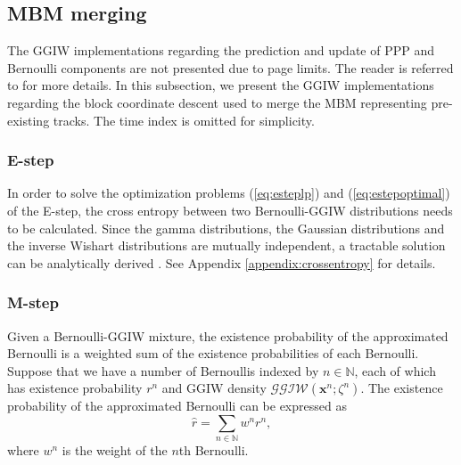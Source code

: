 \documentclass[journal]{IEEEtran}
\begin{document}
\subsection{MBM merging}
The GGIW implementations regarding the prediction and update of PPP and Bernoulli components are not presented due to page limits. The reader is referred to \cite{pmbmextended,pmbmextended2} for more details. In this subsection, we present the GGIW implementations regarding the block coordinate descent used to merge the MBM representing pre-existing tracks. The time index is omitted for simplicity.

\subsubsection{E-step}
In order to solve the optimization problems (\ref{eq:esteplp}) and (\ref{eq:estepoptimal}) of the E-step, the cross entropy between two Bernoulli-GGIW distributions needs to be calculated. Since the gamma distributions, the Gaussian distributions and the inverse Wishart distributions are mutually independent, a tractable solution can be analytically derived \cite{phdextended,gammareduction}. See Appendix \ref{appendix:crossentropy} for details.


\subsubsection{M-step}
Given a Bernoulli-GGIW mixture, the existence probability of the approximated Bernoulli is a weighted sum of the existence probabilities of each Bernoulli. Suppose that we have a number of Bernoullis indexed by $n\in\mathbb{N}$, each of which has existence probability $r^n$ and GGIW density $\mathcal{GGIW}(\mathbf{x}^n;\zeta^n)$. The existence probability of the approximated Bernoulli can be
expressed as
\begin{equation}
    \hat{r} = \sum_{n\in\mathbb{N}} w^nr^n,
\end{equation}
where $w^n$ is the weight of the $n$th Bernoulli. 
\end{document}
